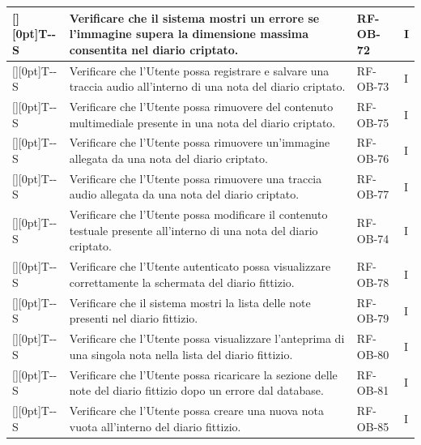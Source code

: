 \documentclass[a4paper,12pt]{article}
\newcounter{testsys}
\newcommand{\systestcode}{%
  \raisebox{0pt}[\height][0pt]{\hypertarget{T-\arabic{testsys}-S}{}}T-\arabic{testsys}-S%
}
\begin{document}
\begin{longtable}{| >{\centering\arraybackslash}p{} | >{\raggedright\arraybackslash}p{} | >{\centering\arraybackslash}p{} | >{\centering\arraybackslash}p{} |}
\stepcounter{testsys} \systestcode & Verificare che il sistema mostri un errore se l'immagine supera la dimensione massima consentita nel diario criptato. & RF-OB-72 & I \\
\hline

\stepcounter{testsys} \systestcode & Verificare che l'Utente possa registrare e salvare una traccia audio all'interno di una nota del diario criptato. & RF-OB-73 & I \\
\hline

\stepcounter{testsys} \systestcode & Verificare che l'Utente possa rimuovere del contenuto multimediale presente in una nota del diario criptato. & RF-OB-75 & I \\
\hline

\stepcounter{testsys} \systestcode & Verificare che l'Utente possa rimuovere un'immagine allegata da una nota del diario criptato. & RF-OB-76 & I \\
\hline

\stepcounter{testsys} \systestcode & Verificare che l'Utente possa rimuovere una traccia audio allegata da una nota del diario criptato. & RF-OB-77 & I \\
\hline

\stepcounter{testsys} \systestcode & Verificare che l'Utente possa modificare il contenuto testuale presente all'interno di una nota del diario criptato. & RF-OB-74 & I \\
\hline

\stepcounter{testsys} \systestcode & Verificare che l'Utente autenticato possa visualizzare correttamente la schermata del diario fittizio. & RF-OB-78 & I \\
\hline

\stepcounter{testsys} \systestcode & Verificare che il sistema mostri la lista delle note presenti nel diario fittizio. & RF-OB-79 & I \\
\hline

\stepcounter{testsys} \systestcode & Verificare che l'Utente possa visualizzare l'anteprima di una singola nota nella lista del diario fittizio. & RF-OB-80 & I \\
\hline

\stepcounter{testsys} \systestcode & Verificare che l'Utente possa ricaricare la sezione delle note del diario fittizio dopo un errore dal database. & RF-OB-81 & I \\
\hline

\stepcounter{testsys} \systestcode & Verificare che l'Utente possa creare una nuova nota vuota all'interno del diario fittizio. & RF-OB-85 & I \\
\hline


\end{longtable}
\end{document}
